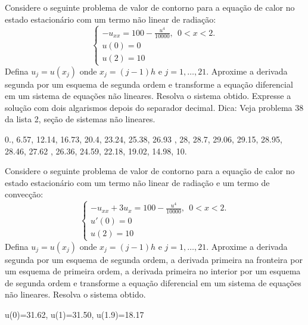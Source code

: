 \begin{Exercise} Considere o seguinte problema de valor de contorno para a equação de calor no estado estacionário com um termo não linear de radiação:
$$\left\{\begin{array}{l}-u_{xx}=100- \frac{u^4}{10000},~~ 0<x<2.\\
u(0)=0\\
u(2)=10\end{array}
\right.
$$
Defina $u_j=u(x_j)$ onde $x_j={(j-1)}{h}$ e $j=1,\ldots,21$. Aproxime a derivada segunda por um esquema de segunda ordem e transforme a equação diferencial em um sistema de equações não lineares. Resolva o sistema  obtido. Expresse  a solução com dois algarismos depois do separador decimal. Dica: Veja problema 38 da lista 2, seção de sistemas não lineares.
\end{Exercise}

\begin{Answer}
  \begin{tiny}
0.,    6.57,    12.14,    16.73,    20.4,    23.24,    25.38,    26.93 ,   28,    28.7,    29.06,    29.15,    28.95,    28.46, 27.62 ,   26.36,    24.59,    22.18,    19.02,    14.98,    10.    
  \end{tiny}
\end{Answer}


\begin{Exercise} Considere o seguinte problema de valor de contorno para a equação de calor no estado estacionário com um termo não linear de radiação e um termo de convecção:
$$\left\{\begin{array}{l}-u_{xx}+3u_x=100- \frac{u^4}{10000},~~ 0<x<2.\\
u'(0)=0\\
u(2)=10\end{array}
\right.
$$
Defina $u_j=u(x_j)$ onde $x_j={(j-1)}{h}$ e $j=1,\ldots,21$. Aproxime a derivada segunda por um esquema de segunda ordem, a derivada primeira na fronteira por um esquema de primeira ordem, a derivada primeira no interior por um esquema de segunda ordem e transforme a equação diferencial em um sistema de equações não lineares. Resolva o sistema  obtido.
\end{Exercise}
\begin{Answer}
  \begin{tiny}
u(0)=31.62, u(1)=31.50, u(1.9)=18.17    
  \end{tiny}
\end{Answer}

